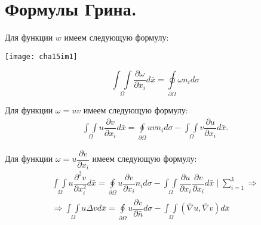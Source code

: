 \chapter{Формулы Грина.}
\label{cha:15}

\begin{theorem}
	Для функции $w$ имеем следующую формулу:
	\begin{multicols}{2}

			\texttt{[image: cha15im1]}
		\columnbreak

			\hfill \break
			$$\underset{\Omega}{\int\int} \dfrac{\partial \omega}{\partial x_i}d\bar{x} = \oint\limits_{\partial \Omega} \omega n_i d\sigma$$
	\end{multicols}
\end{theorem}

\begin{theorem}
	Для функции $ \omega = uv $ имеем следующую формулу:
	$$\begin{gathered}
		\underset{\Omega}{\int\int} u \dfrac{\partial v}{\partial x_i}d\bar{x} = \oint\limits_{\partial \Omega} u v n_i d\sigma - \underset{\Omega}{\int\int} v \dfrac{\partial u}{\partial x_i}d\bar{x}.
	\end{gathered}$$
\end{theorem}

\begin{theorem}
	Для функции $ \omega = u \dfrac{\partial v}{\partial x_i} $ имеем следующую формулу:
	$$\begin{gathered}
		\underset{\Omega}{\int\int} u \dfrac{\partial^2 v}{\partial x^2_i}d\bar{x} = \oint\limits_{\partial \Omega} u \dfrac{\partial v}{\partial x_i} n_i d\sigma - \underset{\Omega}{\int\int} \dfrac{\partial u}{\partial x_i} \dfrac{\partial v}{\partial x_i} d\bar{x} \mid \sum\limits_{i = 1}^k \Longrightarrow \\
		\Longrightarrow \underset{\Omega}{\int\int} u \Delta v d \bar{x} = \oint\limits_{\partial \Omega} u \dfrac{\partial v}{\partial \bar{n}}d\sigma - \underset{\Omega}{\int\int} (\bar{\nabla}u, \bar{\nabla}v)
		d\bar{x}
	\end{gathered}$$
\end{theorem}\newpage

